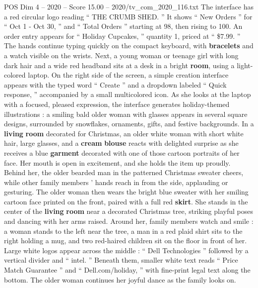 \begin{textsample}{POS Dim 4 – 2020 – Score 15.00 – 2020/tv\_com\_2020\_116.txt}
The interface has a red circular logo reading “ THE CRUMB SHED. ” It shows “ New Orders ” for “ Oct 1 - Oct 30, ” and “ Total Orders ” starting at 98, then rising to 100.
An order entry appears for “ Holiday Cupcakes, ” quantity 1, priced at “ \$7.99. ” The hands continue typing quickly on the compact keyboard, with \textbf{bracelets} and a watch visible on the wrists.
Next, a young woman or teenage girl with long dark hair and a wide red headband sits at a desk in a bright \textbf{room}, using a light-colored laptop.
On the right side of the screen, a simple creation interface appears with the typed word “ Create ” and a dropdown labeled “ Quick response, ” accompanied by a small multicolored icon.
As she looks at the laptop with a focused, pleased expression, the interface generates holiday-themed illustrations : a smiling bald older woman with glasses appears in several square designs, surrounded by snowflakes, ornaments, gifts, and festive backgrounds.
In a \textbf{living} \textbf{room} decorated for Christmas, an older white woman with short white hair, large glasses, and a \textbf{cream} \textbf{blouse} reacts with delighted surprise as she receives a blue \textbf{garment} decorated with one of those cartoon portraits of her face.
Her mouth is open in excitement, and she holds the item up proudly.
Behind her, the older bearded man in the patterned Christmas sweater cheers, while other family members ’ hands reach in from the side, applauding or gesturing.
The older woman then wears the bright blue sweater with her smiling cartoon face printed on the front, paired with a full red \textbf{skirt}.
She stands in the center of the \textbf{living} \textbf{room} near a decorated Christmas tree, striking playful poses and dancing with her arms raised.
Around her, family members watch and smile : a woman stands to the left near the tree, a man in a red plaid shirt sits to the right holding a mug, and two red-haired children sit on the floor in front of her.
Large white logos appear across the middle : “ Dell Technologies ” followed by a vertical divider and “ intel. ” Beneath them, smaller white text reads “ Price Match Guarantee ” and “ Dell.com/holiday, ” with fine-print legal text along the bottom.
The older woman continues her joyful dance as the family looks on.

\end{textsample}
